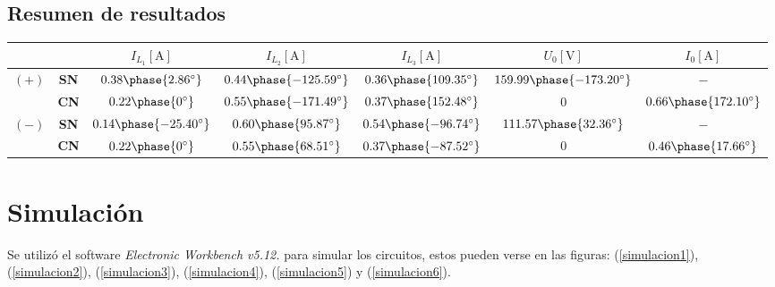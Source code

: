\documentclass[letter,11pt]{article}
\begin{document}
\subsection{Resumen de resultados}
\begin{center}
    \begin{tabular}{|c|c||c|c|c||c|c|}
    \hline
    \multicolumn{2}{|c||}{} &
    $I_{L_1}[\text{A}]$ & $I_{L_2}[\text{A}]$ & $I_{L_3}[\text{A}]$ & $U_0[\text{V}]$ & $I_0[\text{A}]$
    \tabularnewline \hline \hline
    $(+)$ & \textbf{SN} &
    $0.38\phase{2.86^{\circ}}$ &
    $0.44\phase{-125.59^{\circ}}$ &
    $0.36\phase{109.35^{\circ}}$ &
    $159.99\phase{-173.20^{\circ}}$ & $-$
    \tabularnewline \hline
    & \textbf{CN} &
    $0.22\phase{0^{\circ}}$ &
    $0.55\phase{-171.49^{\circ}}$ &
    $0.37\phase{152.48^{\circ}}$ &
    $0$ & $0.66\phase{172.10^{\circ}}$
    \tabularnewline \hline
    $(-)$ & \textbf{SN} &
    $0.14\phase{-25.40^{\circ}}$ &
    $0.60\phase{95.87^{\circ}}$ &
    $0.54\phase{-96.74^{\circ}}$ &
    $111.57\phase{32.36^{\circ}}$ & $-$
    \tabularnewline \hline
    & \textbf{CN} &
    $0.22\phase{0^{\circ}}$ &
    $0.55\phase{68.51^{\circ}}$ &
    $0.37\phase{-87.52^{\circ}}$ &
    $0$ & $0.46\phase{17.66^{\circ}}$
    \tabularnewline \hline
    \end{tabular}
\end{center}

\section{Simulación}
Se utilizó el software \emph{Electronic Workbench v5.12.} para simular
los circuitos, estos pueden verse en las figuras: (\ref{simulacion1}),
(\ref{simulacion2}), (\ref{simulacion3}), (\ref{simulacion4}),
(\ref{simulacion5}) y (\ref{simulacion6}).



\end{document}
